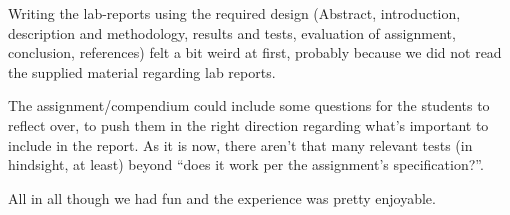 Writing the lab-reports using the required design (Abstract, introduction, description and methodology, results and tests, evaluation of assignment, conclusion, references) felt a bit weird at first, probably because we did not read the supplied material regarding lab reports.

The assignment/compendium could include some questions for the students to reflect over, to push them in the right direction regarding what's important to include in the report.
As it is now, there aren't that many relevant tests (in hindsight, at least) beyond ``does it work per the assignment's specification?''.

All in all though we had fun and the experience was pretty enjoyable.